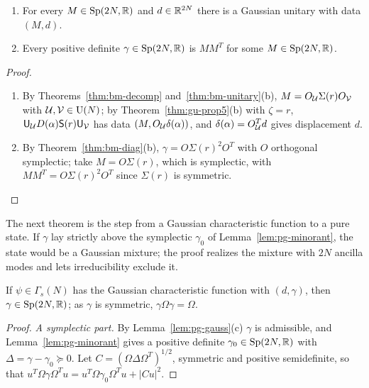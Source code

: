\begin{veteenv}
\begin{lemma}[Existence]\label{lem:pg-exist}
\begin{enumerate}
\item[(a)] For every $M\in\mathrm{Sp}(2N,\mathbb R)$ and $d\in\mathbb R^{2N}$ there is a Gaussian unitary with data $(M,d)$.
\item[(b)] Every positive definite $\gamma\in\mathrm{Sp}(2N,\mathbb R)$ is $MM^T$ for some $M\in\mathrm{Sp}(2N,\mathbb R)$.
\end{enumerate}
\end{lemma}

\begin{proof}
\begin{enumerate}
\item[(a)] By Theorems~\ref{thm:bm-decomp} and~\ref{thm:bm-unitary}(b), $M=O_{\mathcal U}\Sigma(r)O_{\mathcal V}$ with $\mathcal U,\mathcal V\in\mathrm{U}(N)$; by
Theorem~\ref{thm:gu-prop5}(b) with $\zeta=r$, $\mathsf U_\mathcal U D(\alpha)\mathsf S(r)\mathsf U_\mathcal V$ has data $(M,O_\mathcal U\delta(\alpha))$, and $\delta(\alpha)=O_\mathcal U^Td$ gives
displacement $d$.
\item[(b)] By Theorem~\ref{thm:bm-diag}(b), $\gamma=O\Sigma(r)^2O^T$ with $O$ orthogonal symplectic; take $M=O\Sigma(r)$, which is symplectic,
with $MM^T=O\Sigma(r)^2O^T$ since $\Sigma(r)$ is symmetric.\qedhere
\end{enumerate}
\end{proof}

The next theorem is the step from a Gaussian characteristic function to a pure state. If $\gamma$ lay strictly above the symplectic
$\gamma_0$ of Lemma~\ref{lem:pg-minorant}, the state would be a Gaussian mixture; the proof realizes the mixture with $2N$ ancilla
modes and lets irreducibility exclude it.

\begin{theorem}\label{thm:pg-symplectic}
If $\psi\in\Gamma_s(N)$ has the Gaussian characteristic function with $(d,\gamma)$, then $\gamma\in\mathrm{Sp}(2N,\mathbb R)$; as $\gamma$ is symmetric,
$\gamma\Omega\gamma=\Omega$.
\end{theorem}

\begin{proof}
\emph{A symplectic part.} By Lemma~\ref{lem:pg-gauss}(c) $\gamma$ is admissible, and Lemma~\ref{lem:pg-minorant} gives a positive definite
$\gamma_0\in\mathrm{Sp}(2N,\mathbb R)$ with $\Delta=\gamma-\gamma_0\succeq0$. Let $C=(\Omega\Delta\Omega^T)^{1/2}$, symmetric and positive semidefinite, so that
$u^T\Omega\gamma\Omega^Tu=u^T\Omega\gamma_0\Omega^Tu+\lvert Cu\rvert^2$.


\end{proof}
\end{veteenv}
